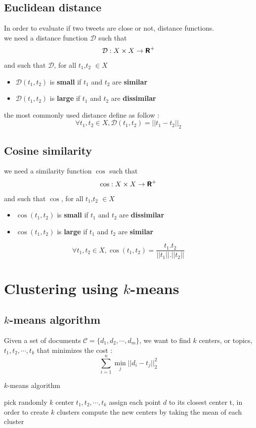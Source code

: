 \documentclass[a4paper,12pt]{report}
\begin{document}
\subsection{Euclidean distance}
In order to evaluate if two tweets are close or not, distance functions.\\
we need a distance function $\mathcal{D}$ such that
$$ \mathcal{D} : X\times X \rightarrow \textbf{\textsf{R}}^+ $$
and such that $\mathcal{D}$, for all $t_1$,$t_2$ $\in X$
\begin{itemize}
\item $\mathcal{D}(t_1,t_2)$ is \textbf{small} if $t_1$ and $t_2$ are \textbf{similar}
\item $\mathcal{D}(t_1,t_2)$ is \textbf{large} if $t_1$ and $t_2$ are \textbf{dissimilar}
\end{itemize}
the most commonly used distance define as follow :
$$ \forall t_1,t_2 \in X, \mathcal{D}(t_1,t_2) = || t_1 - t_2 ||_2 $$


\subsection{Cosine similarity}

we need a similarity function $\cos$ such that
$$ \cos : X\times X \rightarrow \textbf{\textsf{R}}^+ $$
and such that $\cos$, for all $t_1$,$t_2$ $\in X$
\begin{itemize}
\item $\cos(t_1,t_2)$ is \textbf{small} if $t_1$ and $t_2$ are \textbf{dissimilar}
\item $\cos(t_1,t_2)$ is \textbf{large} if $t_1$ and $t_2$ are \textbf{similar}
\end{itemize}

$$ \forall t_1,t_2 \in X, \cos(t_1,t_2) = \frac{t_1.t_2}{||t_1||.||t_2||} $$

\newpage
\section{Clustering using $k$-means}

\subsection{$k$-means algorithm}
Given a set of documents $\mathcal{C} = \{d_1,d_2,\cdots,d_m\}$, we want to find $k$ centers, or topics, $t_1,t_2,\cdots,t_k$ that minimizes the cost :
$$ \sum_{i=1}^n \min_j ||d_i-t_j||_2^2 $$


\begin{algorithm}
\caption{$k$-means algorithm}
\label{algo:kmeans}
\begin{algorithmic} 
\STATE pick randomly $k$ center ${t_1,t_2,\cdots,t_k}$
\REPEAT
\STATE assign each point $d$ to its closest center t, in order to create $k$ clusters
\STATE compute the new centers by taking the mean of each cluster
\end{algorithmic}
\end{algorithm}
\end{document}
